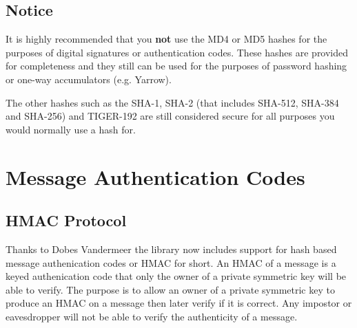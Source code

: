 \documentclass[a4paper]{book}
\begin{document}
\section{Notice}
It is highly recommended that you \textbf{not} use the MD4 or MD5 hashes for the purposes of digital signatures or authentication codes.  
These hashes are provided for completeness and they still can be used for the purposes of password hashing or one-way accumulators
(e.g. Yarrow).

The other hashes such as the SHA-1, SHA-2 (that includes SHA-512, SHA-384 and SHA-256) and TIGER-192 are still considered secure
for all purposes you would normally use a hash for.

\chapter{Message Authentication Codes}
\section{HMAC Protocol}
Thanks to Dobes Vandermeer the library now includes support for hash based message authenication codes or HMAC for short.  An HMAC
of a message is a keyed authenication code that only the owner of a private symmetric key will be able to verify.  The purpose is
to allow an owner of a private symmetric key to produce an HMAC on a message then later verify if it is correct.  Any impostor or
eavesdropper will not be able to verify the authenticity of a message.  
\end{document}
